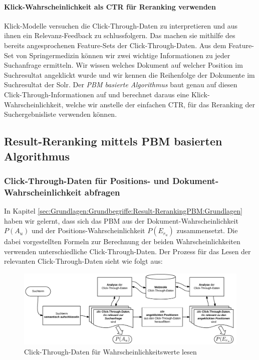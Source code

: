 \paragraph{Klick-Wahrscheinlichkeit als CTR für Reranking verwenden} 
Klick-Modelle versuchen die Click-Through-Daten zu interpretieren und aus ihnen ein Relevanz-Feedback zu schlussfolgern. Das machen sie mithilfe des bereits angesprochenen Feature-Sets der Click-Through-Daten. Aus dem Feature-Set von Springermedizin können wir zwei wichtige Informationen zu jeder Suchanfrage ermitteln. Wir wissen welches Dokument auf welcher Position im Suchresultat angeklickt wurde und wir kennen die Reihenfolge der Dokumente im Suchresultat der Solr. Der \textit{PBM basierte Algorithmus} baut genau auf diesen Click-Through-Informationen auf und berechnet daraus eine Klick-Wahrscheinlichkeit, welche wir anstelle der einfachen CTR, für das Reranking der Suchergebnisliste verwenden können. 

\pagebreak

\subsection{Result-Reranking mittels PBM basierten Algorithmus}
\label{sec:Reranking:Methodik:Result-RerankingPBM}

\subsubsection{Click-Through-Daten für Positions- und Dokument-Wahrscheinlichkeit abfragen}
\label{sec:Reranking:Methodik:Result-RerankingPBM:PositionDokumentWahrscheinlichkeiten}

In Kapitel \ref{sec:Grundlagen:Grundbegriffe:Result-RerankingPBM:Grundlagen} haben wir gelernt, dass sich das PBM aus der Dokument-Wahrscheinlichkeit $P(A_{u})$ und der Positions-Wahrscheinlichkeit $P(E_{r_{u}})$ zusammensetzt. Die dabei vorgestellten Formeln zur Berechnung der beiden Wahrscheinlichkeiten verwenden unterschiedliche Click-Through-Daten. Der Prozess für das Lesen der relevanten Click-Through-Daten sieht wie folgt aus:

\begin{figure}[H]
\centering
\vspace{-1em}
\caption[Click-Through-Daten für Wahrscheinlichkeitswerte lesen]{Click-Through-Daten für Wahrscheinlichkeitswerte lesen}
\label{fig:WahrscheinlichkeitswerteCTDaten}
\includegraphics[width=\linewidth]{gfx/WahrscheinlichkeitswerteCTDaten}
\vspace{-2.5em}
\end{figure}

